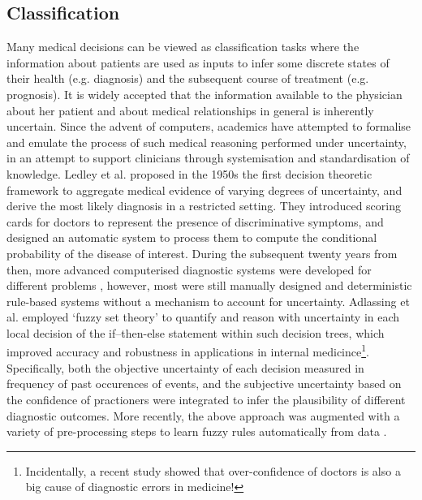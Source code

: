 \subsection*{Classification} 
Many medical decisions can be viewed as classification tasks where the information about patients are used as inputs to infer some discrete states of their health (e.g. diagnosis) and the subsequent course of treatment (e.g. prognosis). It is widely accepted that the information available to the physician about her patient and about medical relationships in general is inherently uncertain. Since the advent of computers, academics have attempted to formalise and emulate the process of such medical reasoning performed under uncertainty,  in an attempt to support clinicians through systemisation and standardisation of knowledge. Ledley et al. \cite{ledley1959reasoning} proposed in the 1950s the first decision theoretic framework to aggregate medical evidence of varying degrees of uncertainty, and derive the most likely diagnosis in a restricted setting. They introduced scoring cards for doctors to represent the presence of discriminative symptoms, and designed an automatic system to process them to compute the conditional probability of the disease of interest. During the subsequent twenty years from then, more advanced computerised diagnostic systems were developed for different problems \cite{shortliffe1979knowledge,kulikowski1980artificial,duda1983expert}, however, most were still manually designed and deterministic rule-based systems without a mechanism to account for uncertainty. Adlassing et al. \cite{adlassnig1985cadiag,adlassnig1986fuzzy} employed `fuzzy set theory' to quantify and reason with uncertainty in each local decision of the if–then-else statement within such decision trees, which improved accuracy and robustness in applications in internal medicince\footnote{Incidentally, a recent study \cite{berner2008overconfidence} showed that over-confidence of doctors is also a big cause of diagnostic errors in medicine!}. Specifically, both the objective uncertainty of each decision measured in frequency of past occurences of events, and the subjective uncertainty based on the confidence of practioners were integrated to infer the plausibility of different diagnostic outcomes. More recently, the above approach was augmented with a variety of pre-processing steps to learn fuzzy rules automatically from data \cite{steimann1998fuzzy,john2005modeling,straszecka2006combining,anooj2012clinical,tsipouras2008automated}. 


